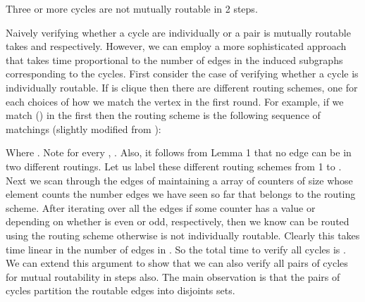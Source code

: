 \documentclass[runningheads,a4paper]{llncs}
\begin{document}
\begin{corollary}
	Three or more cycles are not mutually routable in 2 steps. 
\end{corollary}

\noindent Naively verifying whether a cycle  are individually or a pair  is mutually routable takes  and  respectively. However, we can employ a more sophisticated approach that takes time proportional to the number of edges in the induced subgraphs corresponding to the cycles. First consider the case of verifying whether a cycle  is individually routable. If  is clique then there are  different routing schemes, one for each choices of how we match the  vertex in the first round. For example, if we match  () in the first then the routing scheme is the following sequence   of matchings (slightly modified from \cite{5}): 

 

\noindent Where . Note for every , . Also, it follows from Lemma 1 that no edge can be in two different routings. Let us label these  different routing schemes from 1 to . Next we scan through the edges of  maintaining a array of counters of size  whose  element counts the number edges we have seen so far that belongs to the  routing scheme. After iterating over all the edges if some counter  has a value  or  depending on whether  is even or odd, respectively, then we know  can be routed using the  routing scheme otherwise  is not individually routable. Clearly this takes time linear in the number of edges  in . So the total time to verify all cycles is . We can extend this argument to show that we can also verify all pairs of cycles for mutual routability in  steps also. The main observation is that the pairs of cycles partition the routable edges into disjoints sets. 
\end{document}
